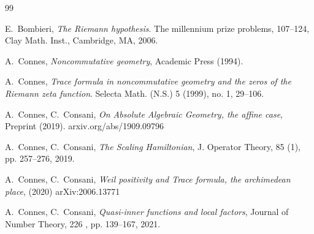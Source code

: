 \documentclass[cupthm]{CUP-JNL-JMJ}
\numberwithin{equation}{section}
\theoremstyle{cupplain}
\theoremstyle{cupdefinition}
\theoremstyle{cupremark}
\theoremstyle{cupproof}
\begin{document}
\begin{Backmatter}




 \begin{thebibliography}{99}

 
  E.~Bombieri, {\em The Riemann hypothesis}. The millennium prize problems, 107--124, Clay Math. Inst., Cambridge, MA, 2006.
 
  A.~Connes, {\it Noncommutative geometry},
 Academic Press (1994).

 A.~Connes, {\em Trace formula in noncommutative geometry and the zeros of the Riemann zeta function}.  Selecta Math. (N.S.)  5  (1999),  no. 1, 29--106.


 







 A.~Connes, C.~Consani, {\em On Absolute Algebraic Geometry, the affine case},  Preprint (2019).
arxiv.org/abs/1909.09796


 A.~Connes, C.~Consani, \emph{The Scaling Hamiltonian}, J. Operator Theory, 85 (1), pp. 257--276, 2019.

  A.~Connes, C.~Consani, {\it Weil positivity and Trace formula, the archimedean place}, 
(2020) arXiv:2006.13771

 A.~Connes, C.~Consani, \emph{Quasi-inner functions and local factors}, Journal of Number Theory, 226 , pp. 139--167, 2021.


\end{thebibliography}
\end{Backmatter}
\end{document}
